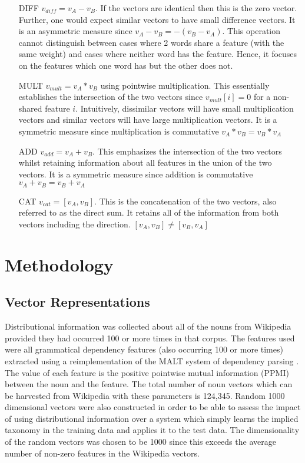 \documentclass[11pt]{article}
\begin{document}
\begin{itemize}
\item[DIFF]{$v_{diff} = v_A - v_B$.  If the vectors are identical then this is the zero vector.  Further, one would expect similar vectors to have small difference vectors.  It is an asymmetric measure since $v_A - v_B = -(v_B - v_A)$.  This operation cannot distinguish between cases where 2 words share a feature (with the same weight) and cases where neither word has the feature.  Hence, it focuses on the features which one word has but the other does not.}
\item[MULT]{$v_{mult} = v_A * v_B$ using pointwise multiplication.  This essentially establishes the intersection of the two vectors since $v_{mult}[i] = 0$ for a non-shared feature $i$.   Intuitively,  dissimilar vectors will have small multiplication vectors and similar vectors will have large multiplication vectors.  It is a symmetric measure since multiplication is commutative $v_A * v_B = v_B * v_A$ }
\item[ADD]{$v_{add} = v_A + v_B$.  This emphasizes the intersection of the two vectors whilst retaining information about all features in the union of the two vectors.  It is a symmetric measure since addition is commutative $v_A + v_B = v_B + v_A$}
\item[CAT]{$v_{cat} = [v_A,v_B]$.  This is the concatenation of the two vectors, also referred to as the direct sum.  It retains all of the information from both vectors including the direction.    $[v_A,v_B] \neq [v_B,v_A]$}
\end{itemize}

\section{Methodology}

\subsection{Vector Representations}

Distributional information was collected about all of the nouns from Wikipedia provided they had occurred 100 or more times in that corpus.  The features used were all grammatical dependency features (also occurring 100 or more times) extracted using a reimplementation of the MALT system of dependency parsing \cite{Nivre2006}.  The value of each feature is the positive pointwise mutual information (PPMI) between the noun and the feature. The total number of noun vectors which can be harvested from Wikipedia with these parameters is 124,345.  Random 1000 dimensional vectors were also constructed in order to be able to assess the impact of using distributional information over a system which simply learns the implied taxonomy in the training data and applies it to the test data.  The dimensionality of the random vectors was chosen to be 1000 since this exceeds the average number of non-zero features in the Wikipedia vectors.
\end{document}
